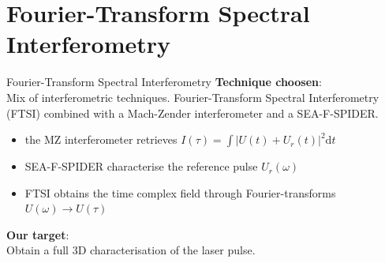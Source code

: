 \documentclass[11pt]{beamer}
\begin{document}
\section{Fourier-Transform Spectral Interferometry}
\begin{frame}{Fourier-Transform Spectral Interferometry}
\textbf{Technique choosen}:\\
Mix of interferometric techniques.
Fourier-Transform Spectral Interferometry (FTSI) combined with a Mach-Zender interferometer and a SEA-F-SPIDER.\\
\begin{itemize}
	\item the MZ interferometer retrieves $I(\tau) 	= \int|U(t) + U_r(t)|^2\mathrm{d}t$
	\item SEA-F-SPIDER characterise the reference pulse $U_r(\omega)$
	\item FTSI obtains the time complex field through Fourier-transforms $U(\omega) \rightarrow U(\tau)$
\end{itemize}

\vspace{15pt}
\textbf{Our target}:\\
Obtain a full 3D characterisation of the laser pulse.
%
\end{frame}

%
%
\end{document}
